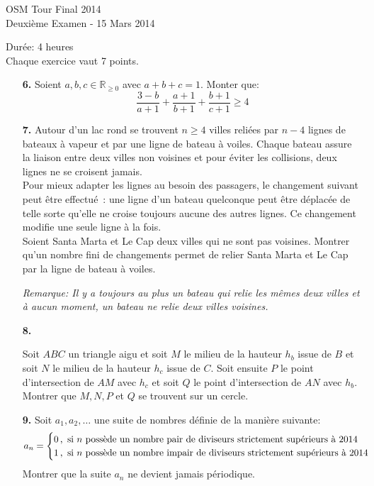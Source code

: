\documentclass[11pt,a4paper]{article}
\theoremstyle{plain}
\theoremstyle{definition}
\newcommand{\R}{\mathbb{R}}
\begin{document}
\newpage

\begin{center}
{\huge OSM Tour Final 2014} \\
\medskip Deuxième Examen - 15 Mars 2014
\end{center}
\vspace{8mm}
Durée: 4 heures\\
Chaque exercice vaut 7 points.

\vspace{15mm}

\begin{enumerate}

\item[\textbf{6.}]
Soient $a,b,c \in \R_{\geq 0}$ avec $a+b+c=1$. Monter que:
\[
\frac{3-b}{a+1}+\frac{a+1}{b+1}+\frac{b+1}{c+1}\geq 4
\]

\bigskip

\item[\textbf{7.}]
Autour d'un lac rond se trouvent $n\geq 4$ villes reliées par $n-4$ lignes de bateaux à vapeur et par une ligne de bateau à voiles. Chaque bateau assure la liaison entre deux villes non voisines et pour éviter les collisions, deux lignes ne se croisent jamais.\\
Pour mieux adapter les lignes au besoin des passagers, le changement suivant peut être effectué~: une ligne d'un bateau quelconque peut être déplacée de telle sorte qu'elle ne croise toujours aucune des autres lignes. Ce changement modifie une seule ligne à la fois.\\
Soient Santa Marta et Le Cap deux villes qui ne sont pas voisines. Montrer qu'un nombre fini de changements permet de relier Santa Marta et Le Cap par la ligne de bateau à voiles. 

\emph{Remarque: Il y a toujours au plus un bateau qui relie les mêmes deux villes et à aucun moment, un  bateau ne relie deux villes voisines.}

\bigskip

\item[\textbf{8.}]

Soit $ABC$ un triangle aigu et soit $M$ le milieu de la hauteur $h_b$ issue de $B$ et soit $N$ le milieu de la hauteur $h_c$ issue de $C$. Soit ensuite $P$ le point d'intersection de $AM $ avec $h_c$ et soit $Q$ le point d'intersection de $AN$ avec $h_b$. Montrer que $M, N, P$ et $Q$ se trouvent sur un cercle.

\bigskip

\item[\textbf{9.}]
Soit $a_1, a_2, \ldots $ une suite de nombres définie de la manière suivante:
\[
a_n = 
\begin{cases}
0 \text{\,,\, si $n$ possède un nombre pair de diviseurs strictement supérieurs à 2014}\\
1 \text{\,,\, si $n$ possède un nombre impair de diviseurs strictement supérieurs à 2014}
\end{cases}
\] 
Montrer que la suite $a_n$ ne devient jamais périodique.


\end{enumerate}
\end{document}
